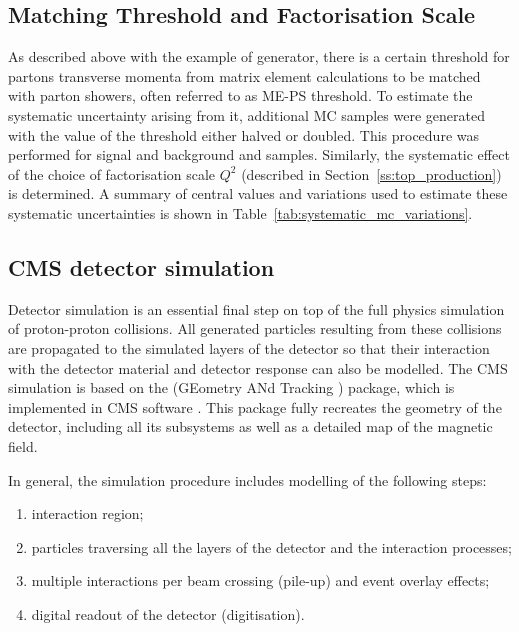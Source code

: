 \subsection{Matching Threshold and Factorisation Scale}
\label{ss:matching_and_factorisation}

As described above with the example of \MADGRAPH generator, there is a certain threshold for partons transverse momenta
from matrix element calculations to be matched with parton showers, often referred to as ME-PS threshold. To estimate
the systematic uncertainty arising from it, additional MC samples were generated with the value of the threshold either
halved or doubled. This procedure was performed for signal \ttjets and background \WpJets and \ZpJets samples.
Similarly, the systematic effect of the choice of factorisation scale $Q^2$ (described in
Section~\ref{ss:top_production}) is determined. A summary of central values and variations used to estimate these
systematic uncertainties is shown in Table~\ref{tab:systematic_mc_variations}.



\subsection{CMS detector simulation}
\label{ss:detector_simulation}

Detector simulation is an essential final step on top of the full physics simulation of proton-proton collisions. All
generated particles resulting from these collisions are propagated to the simulated layers of the detector so that their
interaction with the detector material and detector response can also be modelled. The CMS simulation is based on the
\GEANTfour (GEometry ANd Tracking \autocite{GEANT4}) package, which is implemented in CMS software \CMSSW
\autocite{CMSSW}. This package fully recreates the geometry of the detector, including all its subsystems as well as a
detailed map of the magnetic field.

In general, the simulation procedure includes modelling of the following steps:
\begin{enumerate}[label=\textbullet]
  \item interaction region;
  \item particles traversing all the layers of the detector and the interaction processes;
  \item multiple interactions per beam crossing (pile-up) and event overlay effects;
  \item digital readout of the detector (digitisation).
\end{enumerate}

